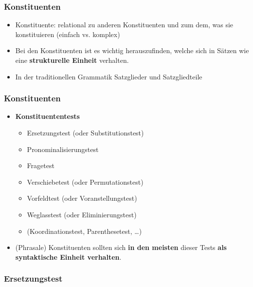 \begin{frame}
\frametitle{Konstituenten}

\begin{itemize}
	\item Konstituente: relational zu anderen Konstituenten und zum dem, was sie konstituieren (\ras einfach vs. komplex)
	\medskip
	\item Bei den Konstituenten ist es wichtig herauszufinden, welche sich in Sätzen wie eine \textbf{strukturelle Einheit} verhalten.
	\medskip
	\item In der traditionellen Grammatik \ras Satzglieder und Satzgliedteile

\end{itemize}

\end{frame}


\begin{frame}
\frametitle{Konstituenten}

\begin{itemize}

	\item \textbf{Konstituententests} \citep[vgl.][]{MyP18a}
	\begin{itemize}
		\item Ersetzungstest (oder Substitutionstest)
		\item Pronominalisierungstest
		\item Fragetest
		\item Verschiebetest (oder Permutationstest)
		\item Vorfeldtest (oder Voranstellungstest) 
		\item Weglasstest (oder Eliminierungstest)
		\item (Koordinationstest, Parenthesetest, \dots )
	\end{itemize}
	\medskip
	\item (Phrasale) Konstituenten sollten sich \textbf{in den meisten} dieser Tests \textbf{als syntaktische Einheit verhalten}.

\end{itemize}

\end{frame}


\subsubsection{Ersetzungstest}

